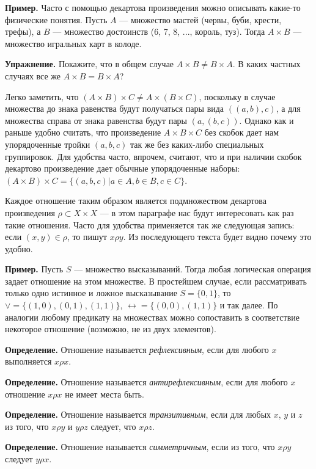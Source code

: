 {\bfseries Пример.} Часто с помощью декартова произведения можно описывать какие-то физические понятия. Пусть $A$ — множество мастей (червы, буби, крести, трефы), а $B$ — множество достоинств (6, 7, 8, ..., король, туз). Тогда $A \times B$ — множество игральных карт в колоде.

{\bfseries Упражнение.} Покажите, что в общем случае $A\times B \not = B \times A$. В каких частных случаях все же $A\times B = B \times A$?

Легко заметить, что $(A\times B)\times C \not= A\times (B \times C)$, поскольку в случае множества до знака равенства будут получаться пары вида $((a, b), c)$, а для множества справа от знака равенства будут пары $(a, (b, c))$. Однако как и раньше удобно считать, что произведение $A\times B\times C$ без скобок дает нам упорядоченные тройки $(a, b, c)$ так же без каких-либо специальных группировок. Для удобства часто, впрочем, считают, что и при наличии скобок декартово произведение дает обычные упорядоченные наборы: $(A\times B)\times C = \{(a, b, c)|a\in A, b\in B, c\in C\}$.

Каждое отношение таким образом является подмножеством декартова произведения $\rho \subset X\times X$ — в этом параграфе нас будут интересовать как раз такие отношения. Часто для удобства применяется так же следующая запись: если $(x, y) \in \rho$, то пишут $x\rho y$. Из последующего текста будет видно почему это удобно.

{\bfseries Пример.} Пусть $S$ — множество высказываний. Тогда любая логическая операция задает отношение на этом множестве. В простейшем случае, если рассматривать только одно истинное и ложное высказывание $S = \{0, 1\}$, то $\vee = \{(1, 0), (0, 1), (1, 1)\}$, $\leftrightarrow = \{(0, 0), (1, 1)\}$ и так далее. По аналогии любому предикату на множествах можно сопоставить в соответствие некоторое отношение (возможно, не из двух элементов).

{\bfseries Определение.} Отношение называется {\slshape рефлексивным}, если для любого $x$ выполняется $x\rho x$.

{\bfseries Определение.} Отношение называется {\slshape антирефлексивным}, если для любого $x$ отношение $x\rho x$ не имеет места быть.

{\bfseries Определение.} Отношение называется {\slshape транзитивным}, если для любых $x$, $y$ и $z$ из того, что $x\rho y$ и $y \rho z$ следует, что $x\rho z$.

{\bfseries Определение.} Отношение называется {\slshape симметричным}, если из того, что $x\rho y$ следует $y\rho x$.

